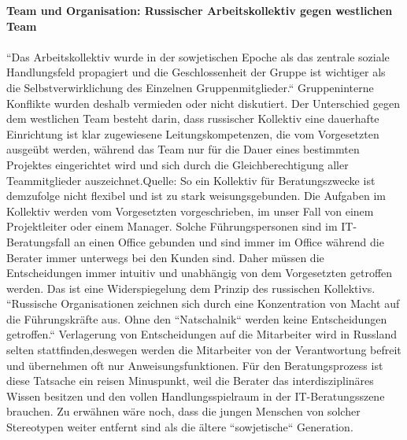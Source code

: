 	\textbf{Team und Organisation: Russischer Arbeitskollektiv gegen westlichen Team}\\
	\\
	``Das Arbeitskollektiv wurde in der sowjetischen 
	Epoche als das zentrale soziale Handlungsfeld propagiert und die Geschlossenheit der Gruppe ist wichtiger als die Selbstverwirklichung des Einzelnen Gruppenmitglieder.`` Gruppeninterne Konflikte wurden deshalb vermieden oder nicht diskutiert. Der Unterschied gegen dem westlichen Team besteht darin, dass russischer Kollektiv eine dauerhafte Einrichtung ist klar zugewiesene Leitungskompetenzen, die vom Vorgesetzten ausgeübt werden, während das Team nur für die Dauer eines bestimmten Projektes eingerichtet wird und sich durch die Gleichberechtigung aller Teammitglieder auszeichnet.Quelle:
	So ein Kollektiv für Beratungszwecke ist demzufolge nicht flexibel und ist zu stark weisungsgebunden. Die Aufgaben im Kollektiv werden vom Vorgesetzten vorgeschrieben, im unser Fall von einem Projektleiter oder einem Manager. Solche Führungspersonen sind im IT-Beratungsfall an einen Office gebunden und sind immer im Office während die Berater immer unterwegs bei den Kunden sind. Daher müssen die Entscheidungen immer intuitiv und unabhängig von dem Vorgesetzten getroffen werden. Das ist eine Widerspiegelung dem Prinzip des russischen Kollektivs. ``Russische Organisationen zeichnen sich durch eine Konzentration von Macht auf die Führungskräfte aus. Ohne den ``Natschalnik`` werden keine Entscheidungen getroffen.`` %
	Verlagerung von Entscheidungen auf die Mitarbeiter wird in Russland selten stattfinden,deswegen werden die Mitarbeiter von der Verantwortung befreit und übernehmen oft nur Anweisungsfunktionen. Für  den Beratungsprozess ist diese Tatsache ein reisen Minuspunkt, weil die Berater das interdisziplinäres Wissen besitzen und  den vollen Handlungsspielraum in der IT-Beratungsszene brauchen.
	Zu erwähnen wäre noch, dass die jungen Menschen von solcher Stereotypen weiter entfernt sind als die ältere ``sowjetische`` Generation. \\

